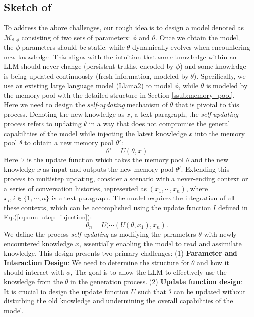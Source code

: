 \subsection{Sketch of \ours}
To address the above challenges, our rough idea is to design a model denoted as $\mathcal{M}_{\theta, \phi}$ consisting of two sets of parameters: $\phi$ and $\theta$. Once we obtain the model, the $\phi$ parameters should be static, while $\theta$ dynamically evolves when encountering new knowledge. This aligns with the intuition that some knowledge within an LLM should never change (persistent truths, encoded by $\phi$) and some knowledge is being updated continuously (fresh information, modeled by $\theta$). 
Specifically, we use an existing large language model (Llama2) to model $\phi$, while $\theta$ is modeled by the memory pool with the detailed structure in Section \ref{ssub:memory_pool}. 
Here we need to design the \textit{self-updating} mechanism of $\theta$ that is pivotal to this process. 
Denoting the new knowledge as $x$, a text paragraph, the \textit{self-updating} process 
refers to 
updating $\theta$ in a way that does not compromise the general capabilities of the model while injecting the latest knowledge $x$ into the memory pool $\theta$ to obtain a new memory pool $\theta'$:
\begin{equation}\label{eq:one_step_injection}
    \theta' = U(\theta, x)
\end{equation}
Here $U$ is the update function which takes the memory pool $\theta$ and the new knowledge $x$ as input and outputs the new memory pool $\theta'$. 
Extending this process to multistep updating, consider a scenario with a never-ending context or a series of conversation histories, represented as $(x_1, \cdots, x_n)$, where $x_i, i\in\{1,\cdots,n\}$ is a text paragraph. The model requires the integration of all these contexts, which can be accomplished using the update function $I$ defined in Eq.(\ref{eq:one_step_injection}): 
\begin{equation}\label{eq:multi_step_injection}
    \theta_n = U(\cdots(U(\theta, x_1), x_n).
\end{equation}
We define the process \textit{self-updating} as modifying the parameters $\theta$ with newly encountered knowledge $x$, essentially enabling the model to read and assimilate knowledge. This design presents two primary challenges: (1) \textbf{Parameter and Interaction Design}: We need to determine the structure for $\theta$ and how it should interact with $\phi$, The goal is to allow the LLM to effectively use the knowledge from the $\theta$ in the generation process. (2) \textbf{Update function design}: It is crucial to design the update function $U$ such that $\theta$ can be updated without disturbing the old knowledge and undermining the overall capabilities of the model. 


